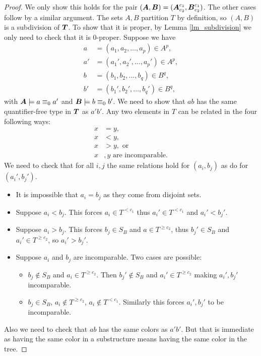 \begin{proof}
  We only show this holds for the pair $(\operatorname{\boldsymbol A}, \operatorname{\boldsymbol B}) = (\operatorname{\boldsymbol A}^{c_1}_{c_2} ,\operatorname{\boldsymbol B}^{c_1}_{c_2})$.
  The other cases follow by a similar argument.
  The sets $A,B$ partition $T$ by definition, so $(A,B)$ is a subdivision of $\operatorname{\boldsymbol T}$.
  To show that it is proper, by Lemma \ref{lm_subdivision} we only need to check that it is $0$-proper. Suppose we have
  \begin{align*}
    a &= (a_1, a_2, \ldots, a_p) \in A^p, \\
    a' &= (a_1', a_2', \ldots, a_p') \in A^p,  \\
    b &= (b_1, b_2, \ldots, b_q) \in B^q,  \\
    b' &= (b_1', b_2', \ldots, b_q') \in B^q, 
  \end{align*}
  with $\operatorname{\boldsymbol A} \models a \equiv_0 a'$ and $\operatorname{\boldsymbol B} \models b \equiv_0 b'$.
  We need to show that $ab$ has the same quantifier-free type in $\operatorname{\boldsymbol T}$ as $a'b'$.
  Any two elements in $T$ can be related in the four following ways:
  \begin{align*}
    x &= y, \\
    x &< y, \\
    x &> y, \text{ or } \\
    x&,y \text{ are incomparable.}
  \end{align*}
  We need to check that  for all $i,j$ the same relations hold for $(a_i, b_j)$ as do for $(a_i', b_j')$.
  
  \begin{itemize}
  \item It is impossible that $a_i = b_j$ as they come from disjoint sets.
  \item Suppose $a_i < b_j$. This forces $a_i \in T^{<c_1}$ thus $a_i' \in T^{<c_1}$ and $a_i' < b_j'$.
  \item Suppose $a_i > b_j$. This forces $b_j \in S_B$ and $a \in T^{\geq c_2}$, thus $b_j' \in S_B$ and $a_i' \in T^{\geq c_2}$, so $a_i' > b_j'$.
  \item Suppose $a_i$ and $b_j$ are incomparable. Two cases are possible:
    \begin{itemize}
    \item $b_j \notin S_B$ and $a_i \in T^{\geq c_2}$. Then $b_j' \notin S_B$ and $a_i' \in T^{\geq c_2}$ making $a_i', b_j'$ incomparable.
    \item $b_j \in S_B$, $a_i \notin T^{\geq c_2}$, $a_i \notin T^{<c_1}$. Similarly this forces $a_i', b_j'$ to be incomparable.
    \end{itemize}
  \end{itemize}
  Also we need to check that $ab$ has the same colors as $a'b'$. But that is immediate as having the same color in a substructure means having the same color in the tree.
\end{proof}

